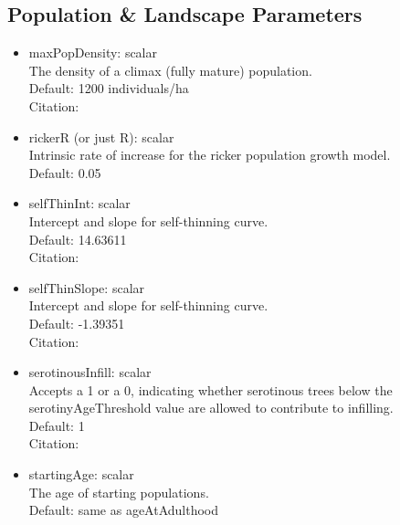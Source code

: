 \documentclass[12pt, english]{article}
\begin{document}
\subsection{Population \& Landscape Parameters}
\begin{itemize}
	\item{maxPopDensity: scalar\\The density of a climax (fully mature) population.\\Default: 1200 individuals/ha\\Citation: \citealt{Kashian2005}}
	\item{rickerR (or just R): scalar\\Intrinsic rate of increase for the ricker population growth model.\\Default: 0.05}
	\item{selfThinInt: scalar\\Intercept and slope for self-thinning curve.\\Default: 14.63611 \\Citation: \citealt{Kashian2005}}
	\item{selfThinSlope: scalar\\Intercept and slope for self-thinning curve.\\Default: -1.39351\\Citation: \citealt{Kashian2005}}
	\item{serotinousInfill: scalar\\Accepts a 1 or a 0, indicating whether serotinous trees below the serotinyAgeThreshold value are allowed to contribute to infilling.\\Default: 1\\Citation: \citealt{Lotan1976,Critchfield1980}}
	\item{startingAge: scalar\\ The age of starting populations.\\Default: same as ageAtAdulthood}
\end{itemize}
\end{document}
